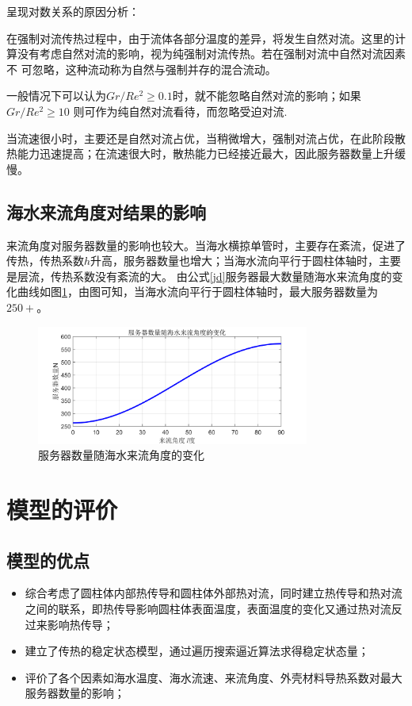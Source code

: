 \documentclass{article}
\begin{document}
   呈现对数关系的原因分析：
   
   在强制对流传热过程中，由于流体各部分温度的差异，将发生自然对流。这里的计算没有考虑自然对流的影响，视为纯强制对流传热。若在强制对流中自然对流因素不
   可忽略，这种流动称为自然与强制并存的混合流动。
   
   一般情况下可以认为$Gr/Re^2 \geq 0.1$时，就不能忽略自然对流的影响；如果$Gr/Re^2\geq 10$
   则可作为纯自然对流看待，而忽略受迫对流.
   
   当流速很小时，主要还是自然对流占优，当稍微增大，强制对流占优，在此阶段散热能力迅速提高；在流速很大时，散热能力已经接近最大，因此服务器数量上升缓慢。
   
   \subsection{海水来流角度对结果的影响}
   来流角度对服务器数量的影响也较大。当海水横掠单管时，主要存在紊流，促进了传热，传热系数$h$升高，服务器数量也增大；当海水流向平行于圆柱体轴时，主要是层流，传热系数没有紊流的大。
   由公式\eqref{jd}服务器最大数量随海水来流角度的变化曲线如图\ref{fwqslsjd}，由图可知，当海水流向平行于圆柱体轴时，最大服务器数量为$250+$。
   \begin{figure}[H]
   	\centering
   	\includegraphics[width=0.8\textwidth]{img/服务器数量随海水来流角度的变化.png}
   	\caption{服务器数量随海水来流角度的变化}
   	\label{fwqslsjd}
   \end{figure}  

 \section{模型的评价}
 \subsection{模型的优点}
	 \begin{itemize}
	 	\item 综合考虑了圆柱体内部热传导和圆柱体外部热对流，同时建立热传导和热对流之间的联系，即热传导影响圆柱体表面温度，表面温度的变化又通过热对流反过来影响热传导；
	 	\item 建立了传热的稳定状态模型，通过遍历搜索逼近算法求得稳定状态量；
	 	\item 评价了各个因素如海水温度、海水流速、来流角度、外壳材料导热系数对最大服务器数量的影响；
	 \end{itemize}
\end{document}
